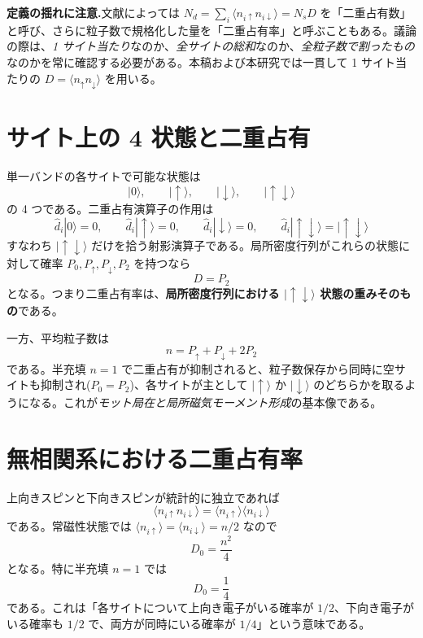 \documentclass[11pt,a4paper]{ltjsarticle}
\newcommand{\ket}[1]{|#1\rangle}
\newcommand{\ev}[1]{\langle #1\rangle}
\newcommand{\up}{\uparrow}
\newcommand{\dn}{\downarrow}
\begin{document}
\begin{cautionbox}
\textbf{定義の揺れに注意.}文献によっては $N_d=\sum_i\ev{n_{i\up}n_{i\dn}}=N_sD$ を「二重占有数」と呼び、さらに粒子数で規格化した量を「二重占有率」と呼ぶこともある。議論の際は、\emph{1 サイト当たり}なのか、\emph{全サイトの総和}なのか、\emph{全粒子数で割ったもの}なのかを常に確認する必要がある。本稿および本研究では一貫して 1 サイト当たりの $D=\ev{n_\up n_\dn}$ を用いる。
\end{cautionbox}

\section{サイト上の 4 状態と二重占有}

単一バンドの各サイトで可能な状態は
\begin{equation}
  \ket{0},\qquad \ket{\up},\qquad \ket{\dn},\qquad \ket{\up\dn}
\end{equation}
の 4 つである。二重占有演算子の作用は
\begin{equation}
  \hat d_i\ket{0}=0,\qquad \hat d_i\ket{\up}=0,\qquad \hat d_i\ket{\dn}=0,\qquad
  \hat d_i\ket{\up\dn}=\ket{\up\dn}
\end{equation}
すなわち $\ket{\up\dn}$ だけを拾う射影演算子である。局所密度行列がこれらの状態に対して確率 $P_0,P_\up,P_\dn,P_2$ を持つなら
\begin{equation}
  \boxed{\ D = P_2\ }
\end{equation}
となる。つまり二重占有率は、\textbf{局所密度行列における $\ket{\up\dn}$ 状態の重みそのもの}である。

一方、平均粒子数は
\begin{equation}
  n = P_\up + P_\dn + 2P_2
\end{equation}
である。半充填 $n=1$ で二重占有が抑制されると、粒子数保存から同時に空サイトも抑制され($P_0=P_2$)、各サイトが主として $\ket{\up}$ か $\ket{\dn}$ のどちらかを取るようになる。これが\emph{モット局在と局所磁気モーメント形成}の基本像である。

\section{無相関系における二重占有率}
\label{sec:uncorrelated}

上向きスピンと下向きスピンが統計的に独立であれば
\begin{equation}
  \ev{n_{i\up}n_{i\dn}} = \ev{n_{i\up}}\ev{n_{i\dn}}
\end{equation}
である。常磁性状態では $\ev{n_{i\up}}=\ev{n_{i\dn}}=n/2$ なので
\begin{equation}
  \boxed{\ D_0 = \frac{n^2}{4}\ }
\end{equation}
となる。特に半充填 $n=1$ では
\begin{equation}
  \boxed{\ D_0 = \frac14\ }
\end{equation}
である。これは「各サイトについて上向き電子がいる確率が $1/2$、下向き電子がいる確率も $1/2$ で、両方が同時にいる確率が $1/4$」という意味である。
\end{document}
